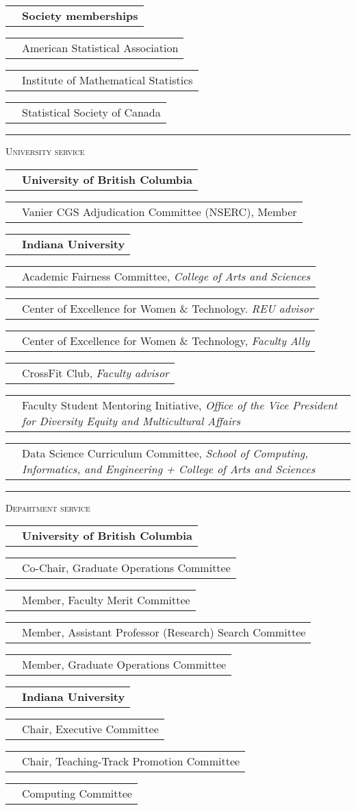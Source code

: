 \documentclass[11pt,letterpaper]{minimal/moderncv}
\makeatletter
\newcommand{\xx}{\textcolor{white}{2022}}
\newcommand{\xxx}{\textcolor{white}{--2022}}
\renewcommand{\cventry}[2]{\cvitem{#1}{\begin{minipage}[t]{\maincolumnwidth}#2\end{minipage}}}
\newcommand{\bolditem}[1]{\cvitem{}{\textbf{#1}}}
\renewcommand{\section}[1]{  \par\addvspace{15pt}%
  \parbox[t]{\hintscolumnwidth}{\strut\raggedleft\raisebox{4pt}%
  {\rule{\hintscolumnwidth}{2pt}}}%
  \hspace{\separatorcolumnwidth}%
  \textsc{\Large #1}\par\nobreak\addvspace{6pt}%
}
\renewcommand*{\cvitem}[2]{%
  \begin{tabular}{@{}p{\hintscolumnwidth}@{\hspace{\separatorcolumnwidth}}%
    p{\maincolumnwidth}@{}}%
    \raggedleft {#1} &  {#2}%
  \end{tabular}%
}
\makeatother
\begin{document}
\vspace{6pt}
\bolditem{Society memberships}
\cvitem{}{American Statistical Association}
\cvitem{}{Institute of Mathematical Statistics}
\cvitem{}{Statistical Society of Canada}

\section{University service}

\cvitem{}{\textbf{University of British Columbia}}
\cventry{2021--2022}{Vanier CGS Adjudication Committee (NSERC), Member }

\vspace{6pt}
\cvitem{}{\textbf{Indiana University}}
\cventry{2019--2020}{Academic Fairness Committee, \emph{College of Arts and Sciences}}

\cventry{2019--2020}{Center of Excellence for Women \& Technology. \emph{REU
  advisor}}

\cventry{2017--2020}{Center of Excellence for Women \& Technology, \emph{Faculty
Ally}}

\cventry{2015--2020}{CrossFit Club, \emph{Faculty advisor}}

\cventry{2016--2018}{Faculty Student Mentoring Initiative, \emph{Office of the
  Vice President for Diversity Equity and Multicultural Affairs}}

\cventry{2014--2018}{Data Science Curriculum Committee, \emph{School
    of Computing, Informatics, and Engineering + College of Arts and Sciences}}






\section{Department service}

\cvitem{}{\textbf{University of British Columbia}}
\cventry{2022--2024}{Co-Chair, Graduate Operations Committee}
\cventry{2022\xxx}{Member, Faculty Merit Committee}
\cventry{2021--2022}{Member, Assistant Professor (Research) Search Committee}
\cventry{2020--\xx}{Member, Graduate Operations Committee}


\vspace{6pt}
\cvitem{}{\textbf{Indiana University}}
\cvitem{2019--2020}{Chair, Executive Committee}

\cvitem{2019--2020}{Chair, Teaching-Track Promotion Committee}

\cvitem{2019--2020}{Computing Committee}
\end{document}

